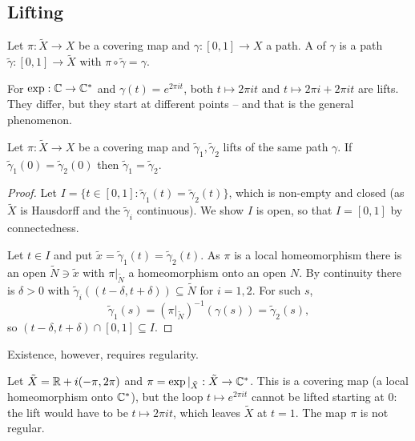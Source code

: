 \documentclass[a4paper]{scrartcl}
\newcommand{\Cs}{\C^*}
\begin{document}
\subsection{Lifting}

\begin{definition}[Lift]
	Let $\pi : \tilde X \to X$ be a covering map and $\gamma : [0,1] \to X$ a path. A
	 of $\gamma$ is a path $\tilde \gamma : [0,1] \to \tilde X$ with
	$\pi \circ \tilde\gamma = \gamma$.
\end{definition}

\begin{example}
	For $\exp : \C \to \Cs$ and $\gamma(t) = e^{2\pi i t}$, both $t \mapsto 2\pi i t$ and
	$t \mapsto 2\pi i + 2\pi i t$ are lifts. They differ, but they start at different
	points -- and that is the general phenomenon.
\end{example}

\begin{proposition}\label{prop:liftunique}
	Let $\pi : \tilde X \to X$ be a covering map and $\tilde\gamma_1, \tilde\gamma_2$ lifts
	of the same path $\gamma$. If $\tilde\gamma_1(0) = \tilde\gamma_2(0)$ then
	$\tilde\gamma_1 = \tilde\gamma_2$.
\end{proposition}

\begin{proof}
	Let $I = \{t \in [0,1] : \tilde\gamma_1(t) = \tilde\gamma_2(t)\}$, which is non-empty
	and closed (as $\tilde X$ is Hausdorff and the $\tilde \gamma_i$ continuous). We show
	$I$ is open, so that $I = [0,1]$ by connectedness.

	Let $t \in I$ and put $\tilde x = \tilde \gamma_1(t) = \tilde\gamma_2(t)$. As $\pi$ is
	a local homeomorphism there is an open $\tilde N \ni \tilde x$ with $\pi|_{\tilde N}$ a
	homeomorphism onto an open $N$. By continuity there is $\delta > 0$ with
	$\tilde\gamma_i((t-\delta, t+\delta)) \subseteq \tilde N$ for $i = 1,2$. For such $s$,
	$$
	\tilde\gamma_1(s) = (\pi|_{\tilde N})^{-1}(\gamma(s)) = \tilde\gamma_2(s),
	$$
	so $(t - \delta, t+\delta) \cap [0,1] \subseteq I$.
\end{proof}

Existence, however, requires regularity.

\begin{example}
	Let $\tilde X = \mathbb{R} + i(-\pi, 2\pi)$ and $\pi = \exp|_{\tilde X} : \tilde X \to \Cs$.
	This is a covering map (a local homeomorphism onto $\Cs$), but the loop
	$t \mapsto e^{2\pi i t}$ cannot be lifted starting at $0$: the lift would have to be
	$t \mapsto 2\pi i t$, which leaves $\tilde X$ at $t=1$. The map $\pi$ is not regular.
\end{example}
\end{document}
